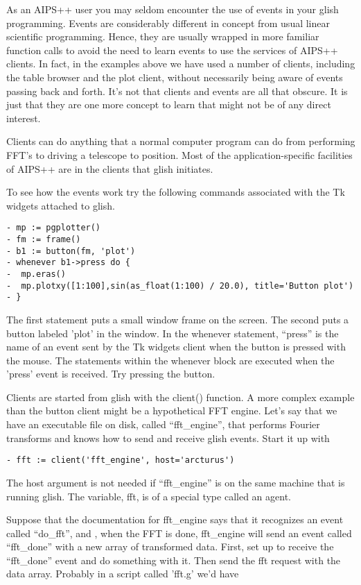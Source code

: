     As an AIPS++ user you may seldom encounter the use of events in your
glish programming.  Events are considerably different in concept from usual
linear scientific programming.  Hence, they are usually wrapped in more
familiar function calls to avoid the need to learn events to use the
services of AIPS++ clients.  In fact, in the examples above we have used
a number of clients, including the table browser and the plot client,
without necessarily being aware of events passing back and forth.  It's not
that clients and events are all that obscure.  It is just that they are one
more concept to learn that might not be of any direct interest.

    Clients can do anything that a normal computer program can do from
performing FFT's to driving a telescope to position.  Most of the
application-specific facilities of AIPS++ are in the clients that glish
initiates.

    To see how the events work try the following commands associated with
the Tk widgets attached to glish.

\begin{verbatim}
- mp := pgplotter()
- fm := frame()
- b1 := button(fm, 'plot')
- whenever b1->press do {
-  mp.eras()
-  mp.plotxy([1:100],sin(as_float(1:100) / 20.0), title='Button plot')
- }
\end{verbatim}

The first statement puts a small window frame on the screen.  The second
puts a button labeled 'plot' in the window.  In the whenever statement,
``press'' is the name of an event sent by the Tk widgets client when the
button is pressed with the mouse.  The statements within the whenever block
are executed when the 'press' event is received.  Try pressing the button.

    Clients are started from glish with the client() function.  A more
complex example than the button client might be a hypothetical FFT engine.
Let's say that we have an executable file on disk, called ``fft\_engine'',
that performs Fourier transforms and knows how to send and receive glish
events.  Start it up with

\begin{verbatim}
- fft := client('fft_engine', host='arcturus')
\end{verbatim}

The host argument is not needed if ``fft\_engine'' is on the same machine that
is running glish.  The variable, fft, is of a special type called an agent.

    Suppose that the documentation for fft\_engine says that it recognizes
an event called ``do\_fft'', and , when the FFT is done, fft\_engine will send
an event called ``fft\_done'' with a new array of transformed data.  First,
set up to receive the ``fft\_done'' event and do something with it.  Then send
the fft request with the data array.  Probably in a script called 'fft.g'
we'd have

